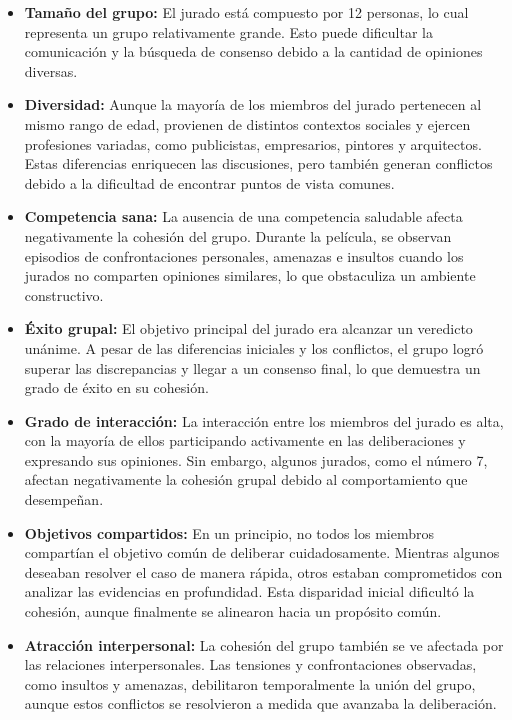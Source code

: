 \documentclass{article}
\begin{document}
\begin{itemize}
    \item \textbf{Tamaño del grupo:} El jurado está compuesto por 12 personas, lo cual representa un grupo relativamente grande. Esto puede dificultar la comunicación y la búsqueda de consenso debido a la cantidad de opiniones diversas.
    
    \item \textbf{Diversidad:} Aunque la mayoría de los miembros del jurado pertenecen al mismo rango de edad, provienen de distintos contextos sociales y ejercen profesiones variadas, como publicistas, empresarios, pintores y arquitectos. Estas diferencias enriquecen las discusiones, pero también generan conflictos debido a la dificultad de encontrar puntos de vista comunes.

    \item \textbf{Competencia sana:} La ausencia de una competencia saludable afecta negativamente la cohesión del grupo. Durante la película, se observan episodios de confrontaciones personales, amenazas e insultos cuando los jurados no comparten opiniones similares, lo que obstaculiza un ambiente constructivo.

    \item \textbf{Éxito grupal:} El objetivo principal del jurado era alcanzar un veredicto unánime. A pesar de las diferencias iniciales y los conflictos, el grupo logró superar las discrepancias y llegar a un consenso final, lo que demuestra un grado de éxito en su cohesión.

    \item \textbf{Grado de interacción:} La interacción entre los miembros del jurado es alta, con la mayoría de ellos participando activamente en las deliberaciones y expresando sus opiniones. Sin embargo, algunos jurados, como el número 7, afectan negativamente la cohesión grupal debido al comportamiento que desempeñan.

    \item \textbf{Objetivos compartidos:} En un principio, no todos los miembros compartían el objetivo común de deliberar cuidadosamente. Mientras algunos deseaban resolver el caso de manera rápida, otros estaban comprometidos con analizar las evidencias en profundidad. Esta disparidad inicial dificultó la cohesión, aunque finalmente se alinearon hacia un propósito común.

    \item \textbf{Atracción interpersonal:} La cohesión del grupo también se ve afectada por las relaciones interpersonales. Las tensiones y confrontaciones observadas, como insultos y amenazas, debilitaron temporalmente la unión del grupo, aunque estos conflictos se resolvieron a medida que avanzaba la deliberación.
\end{itemize}
\end{document}
